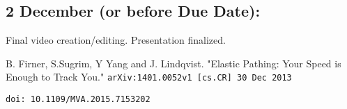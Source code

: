 \documentclass[11pt]{article}
\begin{document}
\subsection{2 December (or before Due Date):}
Final video creation/editing.  Presentation finalized.

\begin{thebibliography}{10}

  B. Firner, S.Sugrim, Y Yang and J. Lindqvist. "Elastic Pathing: Your Speed is Enough to Track You." {\tt arXiv:1401.0052v1 [cs.CR] 30 Dec 2013}

{\tt doi: 10.1109/MVA.2015.7153202}


\end{thebibliography}
\end{document}
